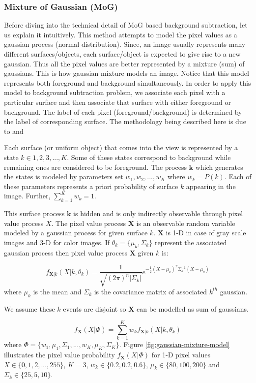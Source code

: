 \subsubsection{Mixture of Gaussian (MoG)}
Before diving into the technical detail of MoG based background subtraction, let us explain it intuitively. This method attempts to model the pixel values as a gaussian process (normal distribution). Since, an image usually represents many different surfaces/objects, each surface/object is expected to give rise to a new gaussian. Thus all the pixel values are better represented by a mixture (sum) of gaussians. This is how gaussian mixture models an image. Notice that this model represents both foreground and background simultaneously. In order to apply this model to background subtraction problem, we associate each pixel with a particular surface and then associate that surface with either foreground or background. The label of each pixel (foreground/background) is determined by the label of corresponding surface. The methodology being described here is due to \cite{stauffer1999adaptive} and \cite{power2002understanding}

Each surface (or uniform object) that comes into the view is represented by a state $k \in {1,2,3,...,K}$. Some of these states correspond to  background while remaining ones are considered to be foreground. The process  $\mathbf{k}$ which generates the states is modeled by parameters set ${w_1, w_2, ..., w_K}$ where $w_k = P(k)$. Each of these parameters represents  a priori probability of surface $k$ appearing in the image. Further, $\sum_{k=1}^K w_k=1$. 

This surface process $\mathbf{k}$ is hidden and is only indirectly observable through pixel value process $X$. The pixel value process $\mathbf{X}$ is an observable random variable modeled by a gaussian process for given surface $k$. $\mathbf{X}$ is 1-D in case of gray scale images and 3-D for color images.  If $\theta_k= \{\mu_k, \Sigma_k \}$  represent the associated gaussian process then pixel value process $\mathbf{X}$ given $k$ is: 

$$ f_{\mathbf{X}|k}(X|k,\theta_k)=\frac{1}{\sqrt{(2\pi)^n |\Sigma_k |}}e^{-\frac{1}{2}(X-\mu_k)^T \Sigma_k^{-1} (X-\mu_k)} $$
where $\mu_k$ is the mean and $\Sigma_k$ is the covariance matrix of associated $k^{th}$ gaussian. 

We assume these $k$ events are disjoint so $\mathbf{X}$ can be modelled as sum of gaussians. 

$$ f_{\mathbf{X}}(X|\Phi)=\sum_{k=1}^K w_k f_{\mathbf{X}|k}(X|k,\theta_k)  $$
where $ \Phi = \{w_1, \mu_1, \Sigma_1,..., w_K, \mu_K, \Sigma_K \}$. Figure \ref{fig:gaussian-mixture-model} illustrates the pixel value probability $f_{\mathbf{X}}(X|\Phi)$  for 1-D pixel values $X \in \{ 0, 1, 2, ..., 255 \}$, $K=3$, $w_k \in \{ 0.2, 0.2, 0.6\}$,  $\mu_k \in \{ 80,100, 200\}$ and  $\Sigma_k \in \{ 25,5,10\}$.    

